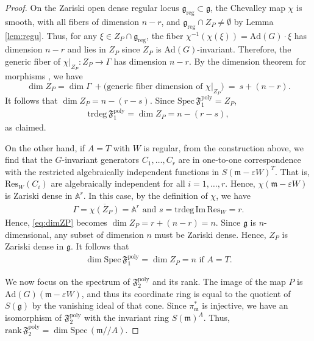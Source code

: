 \documentclass[11pt]{amsart}
\theoremstyle{definition}
\theoremstyle{plain}
\theoremstyle{conclusion}
\begin{document}
\begin{proof}
On the Zariski open dense regular locus $\mathfrak{g}_{\mathrm{reg}}\subset\mathfrak{g}$, the Chevalley map $\chi$ is smooth, with all fibers of dimension $n-r$, and $\mathfrak{g}_{\mathrm{reg}}\cap Z_P\neq\emptyset$ by Lemma \ref{lem:regu}. Thus, for any $\xi\in Z_P\cap\mathfrak{g}_{\mathrm{reg}}$, the fiber $\chi^{-1}(\chi(\xi))=\mathrm{Ad}(G)\cdot\xi$ has dimension $n-r$ and lies in $Z_P$ since $Z_P$ is $\mathrm{Ad}(G)$-invariant. Therefore, the generic fiber of $\chi\vert_{Z_P}:Z_P\to\Gamma$ has dimension $n-r$. By the dimension theorem for morphisms \cite[Chapter II]{HartshorneAG}, we have \begin{equation}
\dim Z_P =  \dim\Gamma\ +\bigl(\text{generic fiber dimension of }\chi\vert_{Z_P}\bigr)\ =\ s+(n-r).\label{eq:dimZP}
\end{equation} It follows that $\dim Z_P=n-(r-s)$. Since $\mathrm{Spec}\, \mathfrak{F}_1^{\mathrm{poly}}=Z_P$, \begin{align*}
\mathrm{trdeg}\,\mathfrak{F}_1^{\mathrm{poly}} = \dim Z_P = n-(r-s),
\end{align*} as claimed.  

On the other hand, if $A = T$ with $W$ is regular, from the construction above, we find that the $G$-invariant generators $C_1,\ldots,C_r$ are in one-to-one correspondence with the restricted algebraically independent functions in $S(\mathfrak{m} -\varepsilon W)^T$. That is, $\mathrm{Res}_W(C_i)$ are algebraically independent for all $i = 1,\ldots,r$. Hence, $\chi(\mathfrak{m} -\varepsilon W) $ is Zariski dense in $\mathbb{A}^r$. In this case, by the definition of $\chi$, we have \begin{align*}
    \Gamma = \overline{\chi(Z_P)} = \mathbb{A}^r \text{ and } s = \mathrm{trdeg}\, \mathrm{Im \, Res}_W = r. 
\end{align*} Hence, \eqref{eq:dimZP} becomes $\dim Z_P= r +  (n-r) = n$. Since $\mathfrak{g}$ is $n$-dimensional,  any subset of dimension $n$ must be Zariski dense. Hence, $Z_P$ is Zariski dense in $\mathfrak{g}$. It follows that \begin{align*}
    \dim \mathrm{Spec}\, \mathfrak{F}_1^{\mathrm{poly}} = \dim Z_P = n \text{ if } A = T.
\end{align*}

We now focus on the spectrum of $\mathfrak{F}_2^{\mathrm{poly}}$ and its rank. The image of the map $P$ is $\mathrm{Ad}(G)(\mathfrak{m}-\varepsilon W)$, and thus its coordinate ring is equal to the quotient of $S(\mathfrak{g})$ by the vanishing ideal of that cone. Since $\pi_\mathfrak{m}^*$ is injective, we have an isomorphism of $\mathfrak{F}_2^{\mathrm{poly}}$ with the invariant ring $S(\mathfrak{m})^A$. Thus, $\mathrm{rank}\, \mathfrak{F}_2^{\mathrm{poly}} = \dim \mathrm{Spec} \,( \mathfrak{m}//A)$. \end{proof}
 
\end{document}
